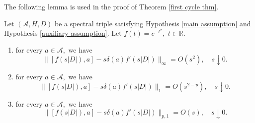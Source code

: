     The following lemma is used in the proof of Theorem \ref{first cycle thm}.
    \begin{lem}\label{third commutator lemma} 
        Let $(\mathcal{A},H,D)$ be a spectral triple satisfying Hypothesis \ref{main assumption} and Hypothesis \ref{auxiliary assumption}. Let $f(t)=e^{-t^2},$ $t\in\mathbb{R}.$
        \begin{enumerate}[{\rm (i)}]
            \item\label{3com1} for every $a\in\mathcal{A},$ we have
                $$\Big\|[f(s|D|),a]-s\delta(a)f'(s|D|)\Big\|_{\infty}=O(s^2),\quad s\downarrow0.$$
            \item\label{3com2} for every $a\in\mathcal{A},$ we have
                $$\Big\|[f(s|D|),a]-s\delta(a)f'(s|D|)\Big\|_1=O(s^{2-p}),\quad s\downarrow0.$$
            \item\label{3com3} for every $a\in\mathcal{A},$ we have
                $$\Big\|[f(s|D|),a]-s\delta(a)f'(s|D|)\Big\|_{p,1}=O(s),\quad s\downarrow0.$$
        \end{enumerate}
    \end{lem}
